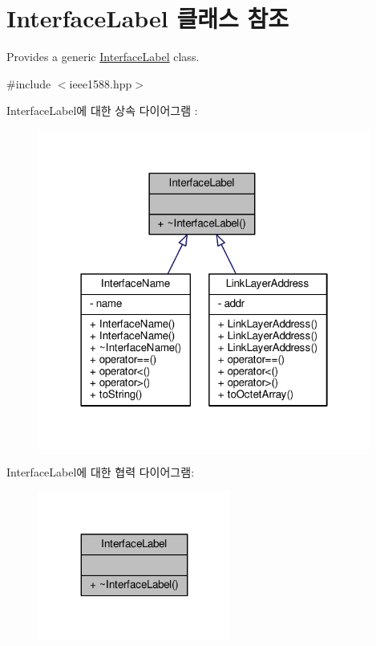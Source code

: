\hypertarget{class_interface_label}{}\section{Interface\+Label 클래스 참조}
\label{class_interface_label}


Provides a generic \hyperlink{class_interface_label}{Interface\+Label} class.  




{\ttfamily \#include $<$ieee1588.\+hpp$>$}



Interface\+Label에 대한 상속 다이어그램 \+: 
\nopagebreak
\begin{figure}[H]
\begin{center}
\leavevmode
\includegraphics[width=310pt]{class_interface_label__inherit__graph}
\end{center}
\end{figure}


Interface\+Label에 대한 협력 다이어그램\+:
\nopagebreak
\begin{figure}[H]
\begin{center}
\leavevmode
\includegraphics[width=179pt]{class_interface_label__coll__graph}
\end{center}
\end{figure}
